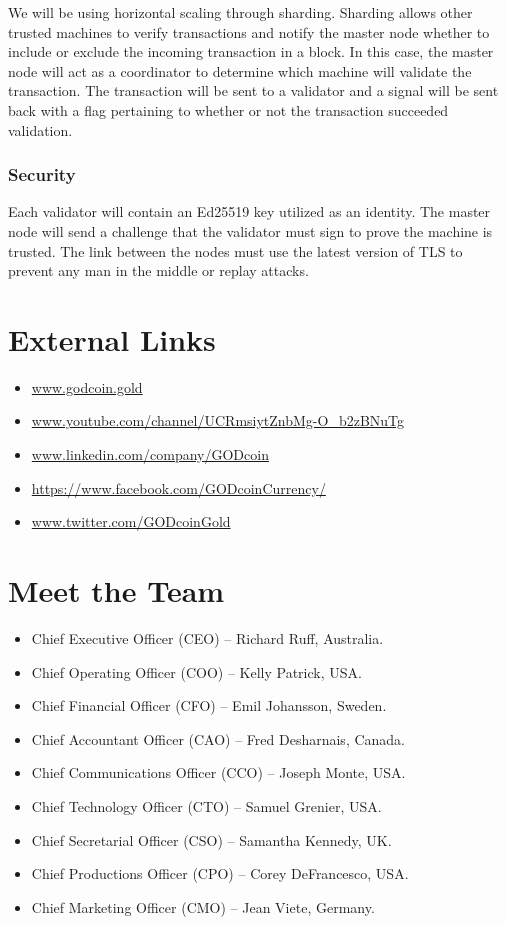 \documentclass[12pt,a4paper]{article}
\begin{document}
  We will be using horizontal scaling through sharding. Sharding allows other
  trusted machines to verify transactions and notify the master node whether to
  include or exclude the incoming transaction in a block. In this case, the
  master node will act as a coordinator to determine which machine will validate
  the transaction. The transaction will be sent to a validator and a signal will
  be sent back with a flag pertaining to whether or not the transaction
  succeeded validation.

  \subsubsection{Security}
  Each validator will contain an Ed25519 key utilized as an identity. The master
  node will send a challenge that the validator must sign to prove the machine
  is trusted. The link between the nodes must use the latest version of TLS to
  prevent any man in the middle or replay attacks.

  \newpage
  \section*{External Links}
  \begin{itemize}
    \item{\url{www.godcoin.gold}}
    \item{\url{www.youtube.com/channel/UCRmsiytZnbMg-O_b2zBNuTg}}
    \item{\url{www.linkedin.com/company/GODcoin}}
    \item{\url{https://www.facebook.com/GODcoinCurrency/}}
    \item{\url{www.twitter.com/GODcoinGold}}
  \end{itemize}
  \section*{Meet the Team}
  \begin{itemize}
    \item{Chief Executive Officer (CEO) – Richard Ruff, Australia.}
    \item{Chief Operating Officer (COO) – Kelly Patrick, USA.}
    \item{Chief Financial Officer (CFO) – Emil Johansson, Sweden.}
    \item{Chief Accountant Officer (CAO) – Fred Desharnais, Canada.}
    \item{Chief Communications Officer (CCO) – Joseph Monte, USA.}
    \item{Chief Technology Officer (CTO) – Samuel Grenier, USA.}
    \item{Chief Secretarial Officer (CSO) – Samantha Kennedy, UK.}
    \item{Chief Productions Officer (CPO) – Corey DeFrancesco, USA.}
    \item{Chief Marketing Officer (CMO) – Jean Viete, Germany.}
  \end{itemize}
  \printbibliography{}
\end{document}
